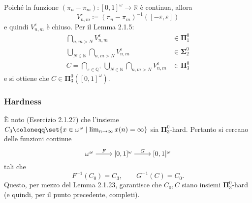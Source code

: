 \documentclass{article}
\newcommand{\1}{\mathds{1}}
\newcommand{\R}{\mathds{R}}
\newcommand{\Q}{\mathds{Q}}
\newcommand{\N}{\mathds{N}}
\begin{document}
\begin{enumerate}
Poiché la funzione \((\pi_{n}-\pi_{m}):[0,1]^{\omega}\to \R\) è continua, allora
\begin{equation*}
V_{n,m}^{\varepsilon} \coloneqq (\pi_{n}-\pi_{m})^{-1}\left([-\varepsilon,\varepsilon]\right)
\end{equation*}
e quindi \(V_{n,m}^{\varepsilon}\) è chiuso. Per il Lemma 2.1.5:
\begin{align*}
\bigcap_{n,m > N} V_{n,m}^{\varepsilon} &\in \bm{\Pi}_{1}^{0}\\
\bigcup_{N \in \N}\bigcap_{n,m > N} V_{n,m}^{\varepsilon} &\in \bm{\Sigma}_{2}^{0}\\
C = \bigcap_{\varepsilon \in \Q^{+}}\bigcup_{N \in \N}\bigcap_{n,m>N} V_{n,m}^{\varepsilon} &\in \bm{\Pi}_{3}^{0}
\end{align*}
e si ottiene che \(C \in \bm{\Pi}_{3}^{0}\left([0,1]^{\omega}\right)\).
\end{enumerate}
\subsubsection{Hardness}
\label{sec:org6873fb5}

È noto (Esercizio 2.1.27) che l'insieme \(C_{3} \coloneqq \set{x \in \omega^{\omega}\mid \lim_{n\to\infty}x(n) = \infty}\) sia \(\bm{\Pi}_{3}^{0}\)-hard. Pertanto si cercano delle funzioni continue
\begin{equation*}
\begin{tikzcd}[ampersand replacement=\&,cramped]
	{\omega^\omega} \& {[0,1]^\omega} \& {[0,1]^\omega}
	\arrow["F", from=1-1, to=1-2]
	\arrow["G", from=1-2, to=1-3]
\end{tikzcd}
\end{equation*}
tali che
\begin{equation*}
F^{-1}(C_{0}) = C_{3},\qquad G^{-1}(C) = C_{0}.
\end{equation*}
Questo, per mezzo del Lemma 2.1.23, garantisce che \(C_{0},C\) siano insiemi \(\bm{\Pi}_{3}^{0}\)-hard (e quindi, per il punto precedente, completi).
\end{document}
